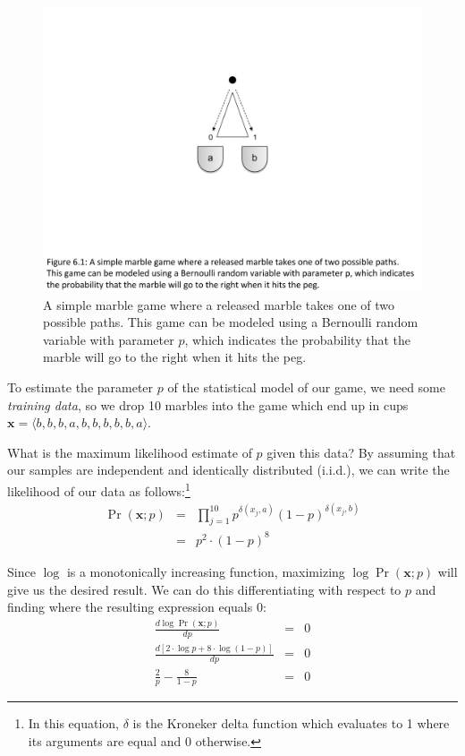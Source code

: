 \begin{figure}
\begin{center}
\includegraphics[scale=0.6]{figures/fig-ch6-em-marble1.pdf}
\end{center}\caption{A simple marble game where a released marble takes one of two possible paths.  This game can be modeled using a Bernoulli random variable with parameter $p$, which indicates the probability that the marble will go to the right when it hits the peg.}\label{chapter6_figure_plinko}
\end{figure}

To estimate the parameter $p$ of the statistical model of our game, we
need some \emph{training data}, so we drop 10 marbles into the game
which end up in cups $\textbf{x} = \langle
b,b,b,a,b,b,b,b,b,a\rangle$.

What is the maximum likelihood estimate of $p$ given this data?  By
assuming that our samples are independent and identically distributed
(i.i.d.), we can write the likelihood of our data as
follows:\footnote{In this equation, $\delta$ is the Kroneker delta
  function which evaluates to 1 where its arguments are equal and 0
  otherwise.}
\begin{eqnarray}
\Pr(\textbf{x};p) & = & \prod_{j=1}^{10} p^{\delta(x_j,a)}(1-p)^{\delta(x_j,b)} \\
&  =  & p^2 \cdot (1 - p)^8
\end{eqnarray}

\noindent Since $\log$ is a monotonically increasing function,
maximizing $\log \Pr(\textbf{x};p)$ will give us the desired result.
We can do this differentiating with respect to $p$ and finding where
the resulting expression equals 0:
\begin{eqnarray}
\frac{d \log \Pr(\textbf{x};p)}{dp} & = & 0\\
\frac{d [ 2\cdot \log p + 8 \cdot \log (1-p) ]}{dp} & = & 0 \\
\frac{2}{p} - \frac{8}{1-p} & = & 0
\end{eqnarray}

